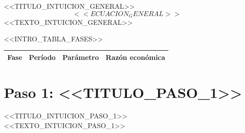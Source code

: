 \documentclass[12pt,a4paper]{article}
\begin{document}
\vspace{0.5cm}

\begin{cajaintuicion}{<<TITULO_INTUICION_GENERAL>>}
\[
<<ECUACION_GENERAL>>
\]
<<TEXTO_INTUICION_GENERAL>>
\end{cajaintuicion}

\vspace{0.5cm}

\noindent <<INTRO_TABLA_FASES>>

\begin{center}
\begin{tabular}{clcp{5.5cm}}
\toprule
\textbf{Fase} & \textbf{Per\'iodo} & \textbf{Par\'ametro} & \textbf{Raz\'on econ\'omica} \\
\midrule
\bottomrule
\end{tabular}
\end{center}

\vspace{1cm}

\section{Paso 1: <<TITULO_PASO_1>>}

\begin{cajaintuicion}{<<TITULO_INTUICION_PASO_1>>}
<<TEXTO_INTUICION_PASO_1>>
\end{cajaintuicion}


\end{document}
